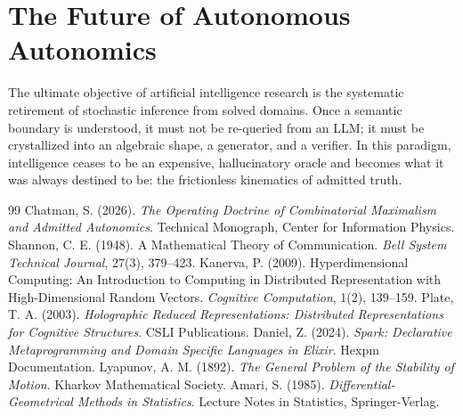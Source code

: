 \documentclass[12pt,oneside,a4paper]{book}
\theoremstyle{definition}
\theoremstyle{plain}
\theoremstyle{remark}
\begin{document}
\section{The Future of Autonomous Autonomics}
The ultimate objective of artificial intelligence research is the systematic retirement of stochastic inference from solved domains. Once a semantic boundary is understood, it must not be re-queried from an LLM; it must be crystallized into an algebraic shape, a generator, and a verifier. In this paradigm, intelligence ceases to be an expensive, hallucinatory oracle and becomes what it was always destined to be: the frictionless kinematics of admitted truth.

\backmatter

\begin{thebibliography}{99}
 Chatman, S. (2026). \emph{The Operating Doctrine of Combinatorial Maximalism and Admitted Autonomics}. Technical Monograph, Center for Information Physics.
 Shannon, C. E. (1948). A Mathematical Theory of Communication. \emph{Bell System Technical Journal}, 27(3), 379--423.
 Kanerva, P. (2009). Hyperdimensional Computing: An Introduction to Computing in Distributed Representation with High-Dimensional Random Vectors. \emph{Cognitive Computation}, 1(2), 139--159.
 Plate, T. A. (2003). \emph{Holographic Reduced Representations: Distributed Representations for Cognitive Structures}. CSLI Publications.
 Daniel, Z. (2024). \emph{Spark: Declarative Metaprogramming and Domain Specific Languages in Elixir}. Hexpm Documentation.
 Lyapunov, A. M. (1892). \emph{The General Problem of the Stability of Motion}. Kharkov Mathematical Society.
 Amari, S. (1985). \emph{Differential-Geometrical Methods in Statistics}. Lecture Notes in Statistics, Springer-Verlag.
\end{thebibliography}
\end{document}

